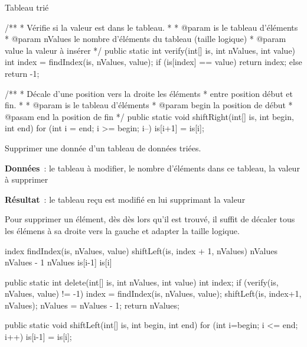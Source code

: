 \begin{Fiche}{Tableau trié}
\begin{java}
/**
 * Vérifie si la valeur est dans le tableau. 
 *
 * @param is le tableau d'éléments
 * @param nValues le nombre d'éléments du tableau (taille logique)
 * @param value la valeur à insérer
 */
public static int verify(int[] is, int nValues, int value){
	int index = findIndex(is, nValues, value);
	if (is[index] == value) {
		return index;
	} else {
		return -1;
	}
}

/**
 * Décale d'une position vers la droite les éléments 
 * entre position début et fin. 
 * 
 * @param is le tableau d'éléments
 * @param begin la position de début
 * @pasam end la position de fin
 */
public static void shiftRight(int[] is, int begin, int end){
	for (int i = end; i >= begin; i--){
		is[i+1] = is[i];
	}
}
	\end{java}

\clearpage
{}


	Supprimer une donnée d'un tableau de données triées.
	
	\textbf{Données}~: le tableau à modifier, le nombre d'éléments dans ce
	tableau, la valeur à supprimer
		
	\textbf{Résultat}~: le tableau reçu est modifié en lui supprimant la valeur
		

	Pour supprimer un élément, dès dès lors qu'il est trouvé, il suffit de décaler tous les élémens à sa droite vers la gauche et adapter la taille logique. 

	\begin{pseudocode}
				\Stmt index \Gets findIndex(is, nValues, value)
				\Stmt shiftLeft(is, index + 1, nValues)
				\Let nValues \Gets nValues - 1	
			\EndIf
			\Return nValues
		\EndAlgo
		\Empty
				\Let is[i-1] \Gets is[i]
			\EndFor
		\EndAlgo
	\end{pseudocode}

	\begin{java}
public static int delete(int[] is, int nValues, int value){
	int index;
	if (verify(is, nValues, value) != -1){
		index = findIndex(is, nValues, value);
		shiftLeft(is, index+1, nValues);
		nValues = nValues - 1;
	}
	return nValues;
}

public static void shiftLeft(int[] is, int begin, int end){
	for (int i=begin; i <= end; i++){
		is[i-1] = is[i];
	}
}
	\end{java}

\end{Fiche}
